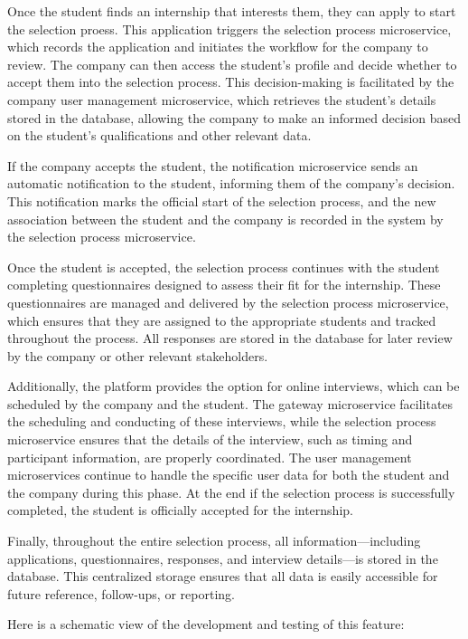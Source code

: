 Once the student finds an internship that interests them, they can apply to start the selection
proess. This application triggers the selection process microservice, which records the
application and initiates the workflow for the company to review. The company can then
access the student's profile and decide whether to accept them into the selection process.
This decision-making is facilitated by the company user management microservice, which retrieves
the student's details stored in the database, allowing the company to make an informed decision
based on the student's qualifications and other relevant data.

If the company accepts the student, the notification microservice sends an automatic notification
to the student, informing them of the company's decision. This notification marks the official
start of the selection process, and the new association between the student and the company is
recorded in the system by the selection process microservice.

Once the student is accepted, the selection process continues with the student completing
questionnaires designed to assess their fit for the internship. These questionnaires are
managed and delivered by the selection process microservice, which ensures that they are
assigned to the appropriate students and tracked throughout the process. All responses
are stored in the database for later review by the company or other relevant stakeholders.

Additionally, the platform provides the option for online interviews, which can be scheduled
by the company and the student. The gateway microservice facilitates the scheduling and
conducting of these interviews, while the selection process microservice ensures that the
details of the interview, such as timing and participant information, are properly coordinated.
The user management microservices continue to handle the specific user data for both the student
and the company during this phase.
At the end if the selection process is successfully completed, the student is officially
accepted for the internship.

Finally, throughout the entire selection process, all information—including applications,
questionnaires, responses, and interview details—is stored in the database.
This centralized storage ensures that all data is easily accessible for future
reference, follow-ups, or reporting.

Here is a schematic view of the development and testing of this feature:


